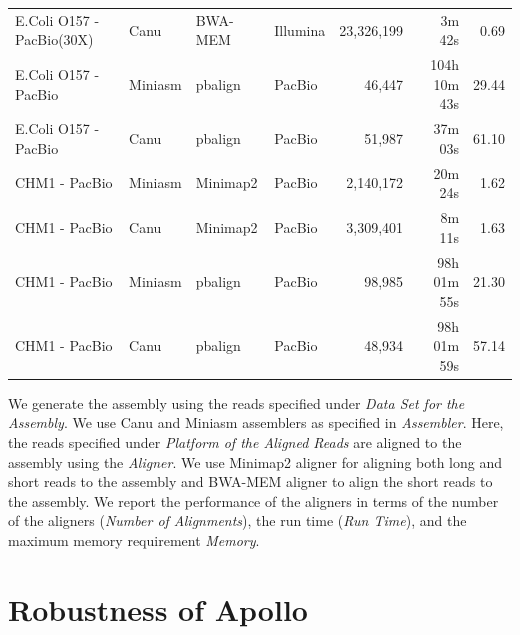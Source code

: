 \documentclass[a4paper]{article}
\begin{document}
\begin{table}[htb]
\begin{center}
{\begin{tabular}{|l|l|l|l|rrr|}
E.Coli O157 - PacBio(30X)& Canu & BWA-MEM & Illumina & 23,326,199 & 3m 42s & 0.69 \\%
E.Coli O157 - PacBio & Miniasm & pbalign & PacBio & 46,447 & 104h 10m 43s & 29.44 \\%
E.Coli O157 - PacBio & Canu & pbalign & PacBio & 51,987 & 37m 03s & 61.10 \\\hhline{|=|=|=|=|===|}
CHM1 - PacBio & Miniasm & Minimap2 & PacBio & 2,140,172 & 20m 24s & 1.62 \\%
CHM1 - PacBio & Canu & Minimap2 & PacBio & 3,309,401 & 8m 11s & 1.63 \\%
CHM1 - PacBio & Miniasm & pbalign & PacBio & 98,985 & 98h 01m 55s & 21.30 \\%
CHM1 - PacBio & Canu & pbalign & PacBio & 48,934 & 98h 01m 59s & 57.14\\\hline
\end{tabular}}
\end{center}
{\small We generate the assembly using the reads specified under \textit{Data Set for the Assembly}. We use Canu \cite{Koren2017} and Miniasm \cite{Li2016a} assemblers as specified in \textit{Assembler}. Here, the reads specified under \textit{Platform of the Aligned Reads} are aligned to the assembly using the \textit{Aligner}. We use Minimap2 \cite{Li2018} aligner for aligning both long and short reads to the assembly and BWA-MEM \cite{Li2009} aligner to align the short reads to the assembly. We report the performance of the aligners in terms of the number of the aligners (\textit{Number of Alignments}), the run time (\textit{Run Time}), and the maximum memory requirement \textit{Memory}.}
\end{table}

\clearpage
\section{Robustness of Apollo}
\end{document}
